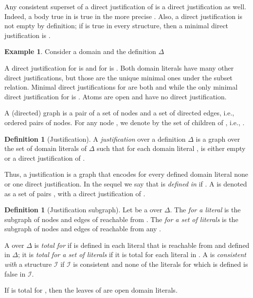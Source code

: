 \documentclass[11pt]{article}
\newcommand{\m}[1]{\ensuremath{#1}\xspace}
\newcommand{\I}{\m{\mathcal{I}}}
\newcommand{\D}{\m{\Delta}}
\theoremstyle{plain}
\theoremstyle{definition}
\newtheorem{definition}[thm]{Definition}
\theoremstyle{example_basic}
\newtheorem{example}[thm]{Example}
\theoremstyle{example_contd}
\theoremstyle{plain}
\newcommand{\change}[1]{#1}
\begin{document}
Any consistent superset  of a direct justification  of
 is a direct justification as well. Indeed, a body  true
in  is true in the more precise . \change{Also, a direct justification
 is not empty by definition; if  is true in every structure,
then a minimal direct justification is .}  

\newcommand{\ar}{\rightarrow}
\begin{example}\label{ex:justif1}
Consider a domain  and the definition \D

A direct justification for  is  and for  is . Both domain literals have many other direct justifications, but those  are the unique minimal ones under the subset relation. Minimal direct justifications for  are both  and  while the only minimal direct justification for  is . Atoms  are open and have no direct justification.
\end{example}

\change{A (directed) graph  is a pair  of a set  of
  nodes and a set  of directed edges, i.e., ordered pairs
   of nodes. For any node , we denote by  the
  set of children of , i.e., .}

\begin{definition}[Justification]
\change{A \emph{justification} over a definition \D is a  graph  over the set of domain literals of \D such that for each domain literal ,
 is either empty or a  direct justification of .}
\end{definition} 
Thus, a justification is a graph that encodes for every defined domain
literal none or one direct justification. 
In the sequel we say that
 is \emph{defined in } if . 
A \justification is denoted as a set of pairs , 
with  a direct justification of .

\begin{definition}[Justification subgraph]
Let \jgraph be a \justification over \D.  The \justification \emph{for a literal}  is the subgraph  of nodes and edges of  reachable from . The \justification \emph{for a set of literals}  is the subgraph  of nodes and edges of  reachable from any .

A \justification \jgraph over \D is \emph{total for}   if   is defined in each literal that is reachable from  and  defined in \D; it is \emph{total for a set of literals}  if it is total for each literal in . A \justification \jgraph is \emph{consistent with} a structure \I if \I is consistent and none of the literals for which \jgraph is defined is false in \I.
\end{definition}
\change{If \jgraph is total for , then the leaves of  are open domain literals.}
 
\end{document}
